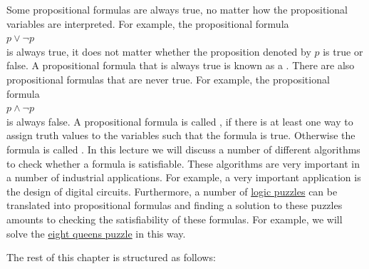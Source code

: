 Some propositional formulas are always true, no matter how the propositional variables are interpreted.
For example, the propositional formula 
\\[0.2cm]
\hspace*{1.3cm}
$p \vee \neg p$
\\[0.2cm]
is always true, it does not matter whether the proposition denoted by $p$ is true or false.  A propositional
formula that is always true is known as a  .  There are also propositional
formulas that are never true.  For example, the propositional formula
\\[0.2cm]
\hspace*{1.3cm}
$p \wedge \neg p$
\\[0.2cm]
is always false.  A propositional formula is called , if there is at least
one way to assign truth values to the variables such that the formula is true.  Otherwise the formula is called
.  In this lecture we will discuss a number of different algorithms to
check whether a formula is satisfiable.  These algorithms are very important in a number of industrial
applications.  For example, a very important application is the design of digital circuits.
Furthermore, a number of \href{https://en.wikipedia.org/wiki/Category:Logic_puzzles}{logic puzzles} can be
translated into propositional formulas and finding a solution to these 
puzzles amounts to checking the satisfiability of these formulas.  For example, we will solve the
\href{https://en.wikipedia.org/wiki/Eight_queens_puzzle}{eight queens puzzle} in this way.

The rest of this chapter is structured as follows:


